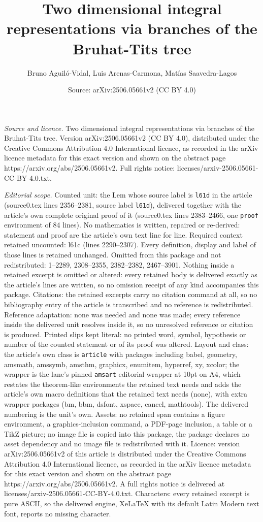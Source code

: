 \documentclass[10pt,a4paper]{amsart}
\title[Two dimensional integral representations via branches of the]{Two dimensional integral representations via branches of the Bruhat-Tits tree}
\author{Bruno Aguil\'o-Vidal, Luis Arenas-Carmona, Mat\'ias Saavedra-Lagos}
\date{Source: arXiv:2506.05661v2 (CC BY 4.0)}
\begin{document}
\maketitle

\noindent\emph{Source and licence.} Two dimensional integral representations via branches of the Bruhat-Tits tree. Version arXiv:2506.05661v2 (CC BY 4.0), distributed under the Creative Commons Attribution 4.0 International licence, as recorded in the arXiv licence metadata for this exact version and shown on the abstract page https://arxiv.org/abs/2506.05661v2. Full rights notice: licenses/arxiv-2506.05661-CC-BY-4.0.txt.\par\smallskip

\noindent\textit{Editorial scope.} Counted unit: the Lem whose source label is \texttt{l61d} in the article (source0.tex lines 2356--2381, source label \texttt{l61d}), delivered together with the article's own complete original proof of it (source0.tex lines 2383--2466, one \texttt{proof} environment of 84 lines). No mathematics is written, repaired or re-derived: statement and proof are the article's own text line for line. Required context retained uncounted: l61c (lines 2290--2307). Every definition, display and label of those lines is retained unchanged. Omitted from this package and not redistributed: 1--2289, 2308--2355, 2382--2382, 2467--3901. Nothing inside a retained excerpt is omitted or altered: every retained body is delivered exactly as the article's lines are written, so no omission receipt of any kind accompanies this package. Citations: the retained excerpts carry no citation command at all, so no bibliography entry of the article is transcribed and no reference is redistributed. Reference adaptation: none was needed and none was made; every reference inside the delivered unit resolves inside it, so no unresolved reference or citation is produced. Printed slips kept literal: no printed word, symbol, hypothesis or number of the counted statement or of its proof was altered. Layout and class: the article's own class is \texttt{article} with packages including babel, geometry, amsmath, amssymb, amsthm, graphicx, enumitem, hyperref, xy, xcolor; the wrapper is the lane's pinned \texttt{amsart} editorial wrapper at 10pt on A4, which restates the theorem-like environments the retained text needs and adds the article's own macro definitions that the retained text needs (none), with extra wrapper packages (bm, bbm, dsfont, xspace, cancel, mathtools). The delivered numbering is the unit's own. Assets: no retained span contains a figure environment, a graphics-inclusion command, a PDF-page inclusion, a table or a TikZ picture; no image file is copied into this package, the package declares no asset dependency and no image file is redistributed with it. Licence: version arXiv:2506.05661v2 of this article is distributed under the Creative Commons Attribution 4.0 International licence, as recorded in the arXiv licence metadata for this exact version and shown on the abstract page https://arxiv.org/abs/2506.05661v2. A full rights notice is delivered at licenses/arxiv-2506.05661-CC-BY-4.0.txt. Characters: every retained excerpt is pure ASCII, so the delivered engine, XeLaTeX with its default Latin Modern text font, reports no missing character.
\end{document}
